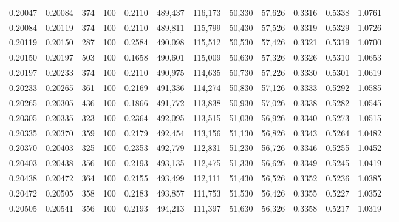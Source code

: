 \begin{tabular}{rrrrrrrrrrrrr}
0.20047 & 0.20084 &   374 & 100 &                                     0.2110 & 489,437 & 116,173 &  50,330 &  57,626 & 0.3316 & 0.5338 & 1.0761 \\
0.20084 & 0.20119 &   374 & 100 &                                     0.2110 & 489,811 & 115,799 &  50,430 &  57,526 & 0.3319 & 0.5329 & 1.0726 \\
0.20119 & 0.20150 &   287 & 100 &                                     0.2584 & 490,098 & 115,512 &  50,530 &  57,426 & 0.3321 & 0.5319 & 1.0700 \\
0.20150 & 0.20197 &   503 & 100 &                                     0.1658 & 490,601 & 115,009 &  50,630 &  57,326 & 0.3326 & 0.5310 & 1.0653 \\
0.20197 & 0.20233 &   374 & 100 &                                     0.2110 & 490,975 & 114,635 &  50,730 &  57,226 & 0.3330 & 0.5301 & 1.0619 \\
0.20233 & 0.20265 &   361 & 100 &                                     0.2169 & 491,336 & 114,274 &  50,830 &  57,126 & 0.3333 & 0.5292 & 1.0585 \\
0.20265 & 0.20305 &   436 & 100 &                                     0.1866 & 491,772 & 113,838 &  50,930 &  57,026 & 0.3338 & 0.5282 & 1.0545 \\
0.20305 & 0.20335 &   323 & 100 &                                     0.2364 & 492,095 & 113,515 &  51,030 &  56,926 & 0.3340 & 0.5273 & 1.0515 \\
0.20335 & 0.20370 &   359 & 100 &                                     0.2179 & 492,454 & 113,156 &  51,130 &  56,826 & 0.3343 & 0.5264 & 1.0482 \\
0.20370 & 0.20403 &   325 & 100 &                                     0.2353 & 492,779 & 112,831 &  51,230 &  56,726 & 0.3346 & 0.5255 & 1.0452 \\
0.20403 & 0.20438 &   356 & 100 &                                     0.2193 & 493,135 & 112,475 &  51,330 &  56,626 & 0.3349 & 0.5245 & 1.0419 \\
0.20438 & 0.20472 &   364 & 100 &                                     0.2155 & 493,499 & 112,111 &  51,430 &  56,526 & 0.3352 & 0.5236 & 1.0385 \\
0.20472 & 0.20505 &   358 & 100 &                                     0.2183 & 493,857 & 111,753 &  51,530 &  56,426 & 0.3355 & 0.5227 & 1.0352 \\
0.20505 & 0.20541 &   356 & 100 &                                     0.2193 & 494,213 & 111,397 &  51,630 &  56,326 & 0.3358 & 0.5217 & 1.0319 \\

\end{tabular}
